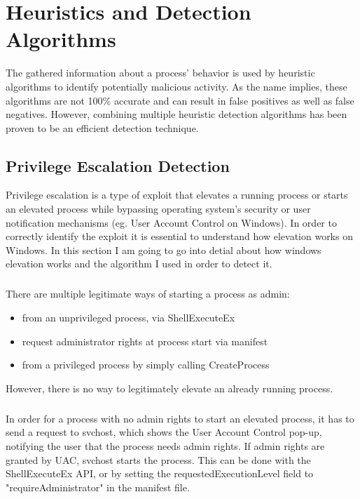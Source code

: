 \chapter{Heuristics and Detection Algorithms}
    The gathered information about a process' behavior is used by heuristic algorithms to identify potentially malicious activity. As the name
    implies, these algorithms are not 100\% accurate and can result in false positives as well as false negatives. However, combining multiple
    heuristic detection algorithms has been proven to be an efficient detection technique.

    \section{Privilege Escalation Detection}
        Privilege escalation is a type of exploit that elevates a running process or starts an elevated process while bypassing operating system's
        security or user notification mechanisms (eg. User Account Control on Windows). In order to correctly identify the exploit it is essential
        to understand how elevation works on Windows. In this section I am going to go into detial about how windows elevation works and the
        algorithm I used in order to detect it.

        \paragraph{}
        There are multiple legitimate ways of starting a process as admin:
        \begin{itemize}
            \item from an unprivileged process, via ShellExecuteEx %
            \item request administrator rights at process start via manifest
            \item from a privileged process by simply calling CreateProcess
        \end{itemize}
        However, there is no way to legitimately elevate an already running process.

        \paragraph{}
        In order for a process with no admin rights to start an elevated process, it has to send a request to svchost, which shows the User Account
        Control pop-up, notifying the user that the process needs admin rights. If admin rights are granted by UAC, svchost starts the process.
        This can be done with the ShellExecuteEx API, or by setting the requestedExecutionLevel field to "requireAdministrator" in the manifest
        file.

